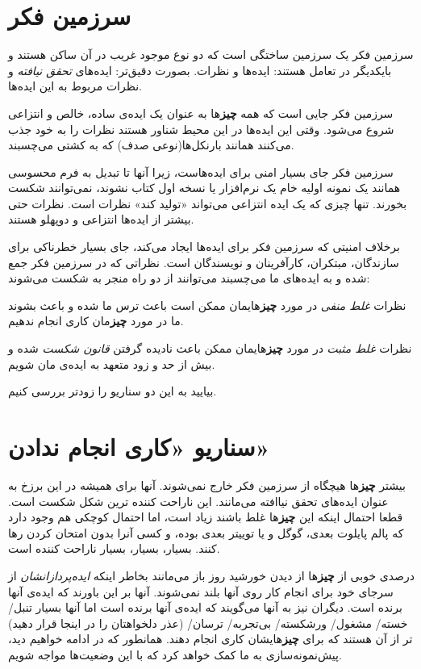 \section{سرزمین
فکر}\label{ux633ux631ux632ux645ux6ccux646-ux641ux6a9ux631}

سرزمین فکر یک سرزمین ساختگی است که دو نوع موجود غریب در آن ساکن هستند و
بایکدیگر در تعامل هستند: ایده‌ها و نظرات. بصورت دقیق‌تر: ایده‌های
\emph{تحقق نیافته} و نظرات مربوط به این ایده‌ها.

سرزمین فکر جایی است که همه \textbf{چیز}ها به عنوان یک ایده‌ی ساده، خالص
و انتزاعی شروع می‌شود. وقتی این ایده‌ها در این محیط شناور هستند نظرات را
به خود جذب می‌کنند همانند بارنکل‌ها(نوعی صدف) که به کشتی می‌چسبند.

سرزمین فکر جای بسیار امنی برای ایده‌هاست، زیرا آنها تا تبدیل به فرم
محسوسی همانند یک نمونه اولیه خام یک نرم‌افزار یا نسخه اول کتاب نشوند،
نمی‌توانند شکست بخورند. تنها چیزی که یک ایده انتزاعی می‌تواند «تولید
کند» نظرات است. نظرات حتی بیشتر از ایده‌ها انتزاعی و دوپهلو هستند.

برخلاف امنیتی که سرزمین فکر برای ایده‌ها ایجاد می‌کند، جای بسیار خطرناکی
برای سازندگان، مبتکران، کارآفرینان و نویسندگان است. نظراتی که در سرزمین
فکر جمع شده و به ایده‌های ما می‌چسبند می‌توانند از دو راه منجر به شکست
می‌شوند:

نظرات \emph{غلط منفی} در مورد \textbf{چیز}هایمان ممکن است باعث ترس ما
شده و باعث بشوند ما در مورد \textbf{چیز}مان کاری انجام ندهیم.

نظرات \emph{غلط مثبت} در مورد \textbf{چیز}هایمان ممکن باعث نادیده گرفتن
\emph{قانون شکست} شده و بیش از حد و زود متعهد به ایده‌ی مان شویم.

بیایید به این دو سناریو را زودتر بررسی کنیم.

\section{سناریو «کاری انجام
ندادن»}\label{ux633ux646ux627ux631ux6ccux648-ux6a9ux627ux631ux6cc-ux627ux646ux62cux627ux645-ux646ux62fux627ux62fux646}

بیشتر \textbf{چیز}ها هیچگاه از سرزمین فکر خارج نمی‌شوند. آنها برای همیشه
در این برزخ به عنوان ایده‌های تحقق نیاافته می‌مانند. این ناراحت کننده
ترین شکل شکست است. قطعا احتمال اینکه این \textbf{چیز}ها غلط باشند زیاد
است، اما احتمال کوچکی هم وجود دارد که پالم پایلوت بعدی، گوگل و یا توییتر
بعدی بوده، و کسی آنرا بدون امتحان کردن رها کنند. بسیار، بسیار، بسیار
ناراحت کننده است.

درصدی خوبی از \textbf{چیز}ها از دیدن خورشید روز باز می‌مانند بخاطر اینکه
\emph{ایده‌پردازانشان} از سرجای خود برای انجام کار روی آنها بلند
نمی‌شوند. آنها بر این باورند که ایده‌ی آنها برنده است. دیگران نیز به
آنها می‌گویند که ایده‌ی آنها برنده است اما آنها بسیار تنبل/ خسته/ مشغول/
ورشکسته/ بی‌تجربه/ ترسان/ (عذر دلخواهتان را در اینجا قرار دهید) تر از آن
هستند که برای \textbf{چیز}هایشان کاری انجام دهند. همانطور که در ادامه
خواهیم دید، پیش‌نمونه‌سازی به ما کمک خواهد کرد که با این وضعیت‌ها مواجه
شویم.

